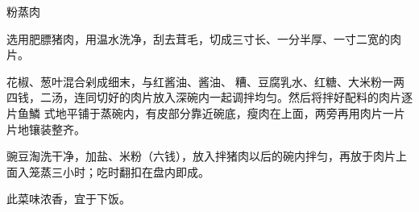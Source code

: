 \begin{recipe}{粉蒸肉}

\ingredients


\preparation

\step 选用肥膘猪肉，用温水洗净，刮去茸毛，切成三寸长、一分半厚、一寸二宽的肉片。

\step 花椒、葱叶混合剁成细末，与红酱油、酱油、𫃑糟、豆腐乳水、红糖、大米粉一两
四钱，二汤，连同切好的肉片放入深碗内一起调拌均匀。然后将拌好配料的肉片逐片鱼鱗
式地平铺于蒸碗内，有皮部分靠近碗底，瘦肉在上面，两旁再用肉片一片片地镶装整齐。

\step 豌豆淘洗干净，加盐、米粉（六钱），放入拌猪肉以后的碗内拌匀，再放于肉片上
面入笼蒸三小时；吃时翻扣在盘内即成。

\features

此菜味浓香，宜于下饭。


\end{recipe}

